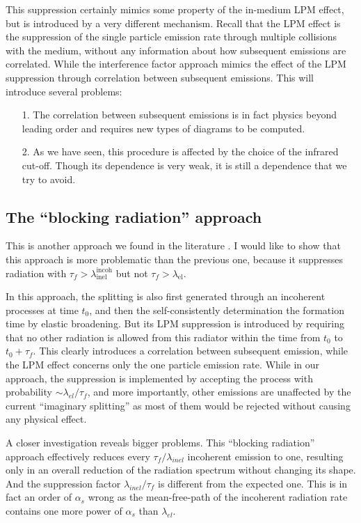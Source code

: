 This suppression certainly mimics some property of the in-medium LPM effect, but is introduced by a very different mechanism.
Recall that the LPM effect is the suppression of the single particle emission rate through multiple collisions with the medium, without any information about how subsequent emissions are correlated. 
While the interference factor approach mimics the effect of the LPM suppression through correlation between subsequent emissions.
This will introduce several problems: 
\begin{itemize}
\item[1.] The correlation between subsequent emissions is in fact physics beyond leading order and requires new types of diagrams to be computed.
\item[2.] As we have seen, this procedure is affected by the choice of the infrared cut-off. Though its dependence is very weak, it is still a dependence that we try to avoid.
\end{itemize}

\subsection{The ``blocking radiation'' approach}
This is another approach we found in the literature \cite{ColemanSmith:2012vr}.
I would like to show that this approach is more problematic than the previous one, because it suppresses radiation with $\tau_f > \lambda_{\textrm{inel}}^{\textrm{incoh}}$ but not $\tau_f > \lambda_{\textrm{el}}$.

In this approach, the splitting is also first generated through an incoherent processes at time $t_0$, and then the self-consistently determination the formation time by elastic broadening. 
But its LPM suppression is introduced by requiring that no other radiation is allowed from this radiator within the time from $t_0$ to $t_0 + \tau_f$.
This clearly introduces a correlation between subsequent emission, while the LPM effect concerns only the one particle emission rate.
While in our approach, the suppression is implemented by accepting the process with probability $\sim \lambda_{el}/\tau_f$, and more importantly, other emissions are unaffected by the current ``imaginary splitting'' as most of them would be rejected without causing any physical effect.

A closer investigation reveals bigger problems.
This ``blocking radiation'' approach effectively reduces every $\tau_f/\lambda_{inel}$ incoherent emission to one, resulting only in an overall reduction of the radiation spectrum without changing its shape.
And the suppression factor $\lambda_{inel}/\tau_f$ is different from the expected one.
This is in fact an order of $\alpha_s$ wrong as the mean-free-path of the incoherent radiation rate contains one more power of $\alpha_s$ than $\lambda_{el}$.

